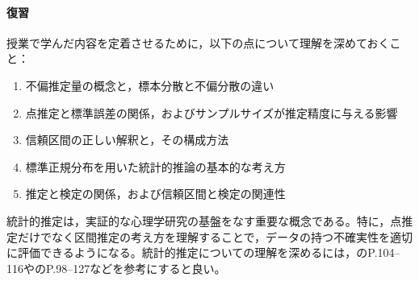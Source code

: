 \paragraph{復習}
授業で学んだ内容を定着させるために，以下の点について理解を深めておくこと：

\begin{enumerate}
\item 不偏推定量の概念と，標本分散と不偏分散の違い
\item 点推定と標準誤差の関係，およびサンプルサイズが推定精度に与える影響
\item 信頼区間の正しい解釈と，その構成方法
\item 標準正規分布を用いた統計的推論の基本的な考え方
\item 推定と検定の関係，および信頼区間と検定の関連性
\end{enumerate}

統計的推定は，実証的な心理学研究の基盤をなす重要な概念である。特に，点推定だけでなく区間推定の考え方を理解することで，データの持つ不確実性を適切に評価できるようになる。統計的推定についての理解を深めるには，\textcite{Kawabata201408}のP.104--116や\textcite{Yamada2004}のP.98--127などを参考にすると良い。